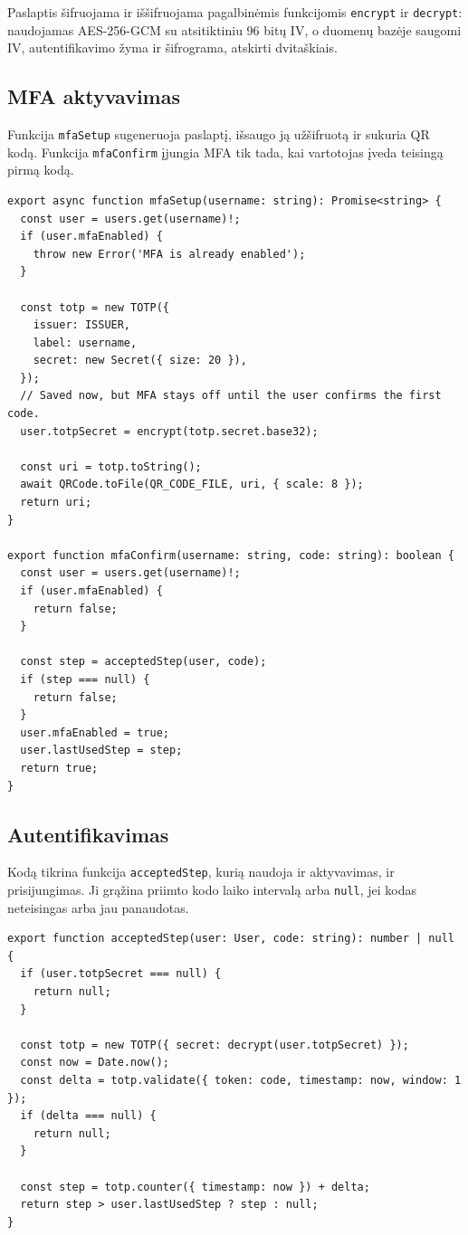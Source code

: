 Paslaptis šifruojama ir iššifruojama pagalbinėmis funkcijomis \texttt{encrypt} ir \texttt{decrypt}: naudojamas AES-256-GCM su atsitiktiniu 96 bitų IV, o duomenų bazėje saugomi IV, autentifikavimo žyma ir šifrograma, atskirti dvitaškiais.

\subsection{MFA aktyvavimas}
\label{subsec:realizacija_aktyvavimas}

Funkcija \texttt{mfaSetup} sugeneruoja paslaptį, išsaugo ją užšifruotą ir sukuria QR kodą. Funkcija \texttt{mfaConfirm} įjungia MFA tik tada, kai vartotojas įveda teisingą pirmą kodą.

\begin{lstlisting}
export async function mfaSetup(username: string): Promise<string> {
  const user = users.get(username)!;
  if (user.mfaEnabled) {
    throw new Error('MFA is already enabled');
  }

  const totp = new TOTP({
    issuer: ISSUER,
    label: username,
    secret: new Secret({ size: 20 }),
  });
  // Saved now, but MFA stays off until the user confirms the first code.
  user.totpSecret = encrypt(totp.secret.base32);

  const uri = totp.toString();
  await QRCode.toFile(QR_CODE_FILE, uri, { scale: 8 });
  return uri;
}

export function mfaConfirm(username: string, code: string): boolean {
  const user = users.get(username)!;
  if (user.mfaEnabled) {
    return false;
  }

  const step = acceptedStep(user, code);
  if (step === null) {
    return false;
  }
  user.mfaEnabled = true;
  user.lastUsedStep = step;
  return true;
}
\end{lstlisting}

\subsection{Autentifikavimas}
\label{subsec:realizacija_autentifikavimas}

Kodą tikrina funkcija \texttt{acceptedStep}, kurią naudoja ir aktyvavimas, ir prisijungimas. Ji grąžina priimto kodo laiko intervalą arba \texttt{null}, jei kodas neteisingas arba jau panaudotas.

\begin{lstlisting}
export function acceptedStep(user: User, code: string): number | null {
  if (user.totpSecret === null) {
    return null;
  }

  const totp = new TOTP({ secret: decrypt(user.totpSecret) });
  const now = Date.now();
  const delta = totp.validate({ token: code, timestamp: now, window: 1 });
  if (delta === null) {
    return null;
  }

  const step = totp.counter({ timestamp: now }) + delta;
  return step > user.lastUsedStep ? step : null;
}
\end{lstlisting}

